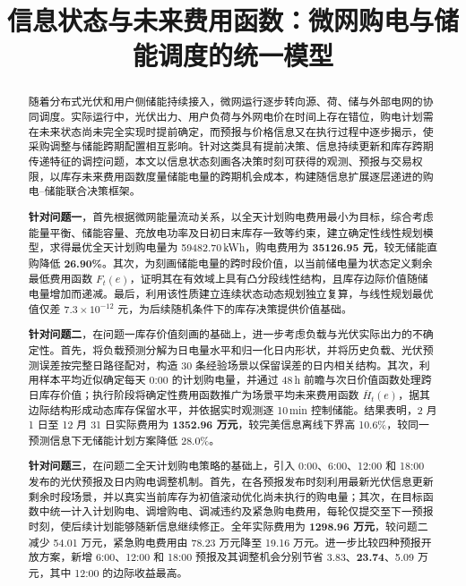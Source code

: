 \documentclass[withoutpreface,bwprint]{cumcmthesis}
\title{信息状态与未来费用函数：微网购电与储能调度的统一模型}
\begin{document}
\maketitle
\begin{abstract}
随着分布式光伏和用户侧储能持续接入，微网运行逐步转向源、荷、储与外部电网的协同调度。实际运行中，光伏出力、用户负荷与外网电价在时间上存在错位，购电计划需在未来状态尚未完全实现时提前确定，而预报与价格信息又在执行过程中逐步揭示，使采购调整与储能跨期配置相互影响。针对这类具有提前决策、信息持续更新和库存跨期传递特征的调控问题，本文以信息状态刻画各决策时刻可获得的观测、预报与交易权限，以库存未来费用函数度量储能电量的跨期机会成本，构建随信息扩展逐层递进的购电--储能联合决策框架。

\textbf{针对问题一}，首先根据微网能量流动关系，以全天计划购电费用最小为目标，综合考虑能量平衡、储能容量、充放电功率及日初日末库存一致等约束，建立确定性线性规划模型，求得最优全天计划购电量为 59482.70\,kWh，购电费用为 \textbf{35126.95 元}，较无储能直购降低 \textbf{26.90\%}。其次，为刻画储能电量的跨时段价值，以当前储电量为状态定义剩余最低费用函数 $F_t(e)$，证明其在有效域上具有凸分段线性结构，且库存边际价值随储电量增加而递减。最后，利用该性质建立连续状态动态规划独立复算，与线性规划最优值仅差 $7.3\times10^{-12}$ 元，为后续随机条件下的库存决策提供价值基础。

\textbf{针对问题二}，在问题一库存价值刻画的基础上，进一步考虑负载与光伏实际出力的不确定性。首先，将负载预测分解为日电量水平和归一化日内形状，并将历史负载、光伏预测误差按完整日路径配对，构造 30 条经验场景以保留误差的日内相关结构。其次，利用样本平均近似确定每天 0:00 的计划购电量，并通过 48\,h 前瞻与次日价值函数处理跨日库存价值；执行阶段将确定性费用函数推广为场景平均未来费用函数 $\bar H_t(e)$，据其边际结构形成动态库存保留水平，并依据实时观测逐 10\,min 控制储能。结果表明，2 月 1 日至 12 月 31 日实际费用为 \textbf{1352.96 万元}，较完美信息离线下界高 10.6\%，较同一预测信息下无储能计划方案降低 28.0\%。

\textbf{针对问题三}，在问题二全天计划购电策略的基础上，引入 0:00、6:00、12:00 和 18:00 发布的光伏预报及日内购电调整机制。首先，在各预报发布时刻利用最新光伏信息更新剩余时段场景，并以真实当前库存为初值滚动优化尚未执行的购电量；其次，在目标函数中统一计入计划购电、调增购电、调减违约及紧急购电费用，每轮仅提交至下一预报时刻，使后续计划能够随新信息继续修正。全年实际费用为 \textbf{1298.96 万元}，较问题二减少 54.01 万元，紧急购电费用由 78.23 万元降至 19.16 万元。进一步比较四种预报开放方案，新增 6:00、12:00 和 18:00 预报及其调整机会分别节省 3.83、\textbf{23.74}、5.09 万元，其中 12:00 的边际收益最高。


\end{abstract}
\end{document}
